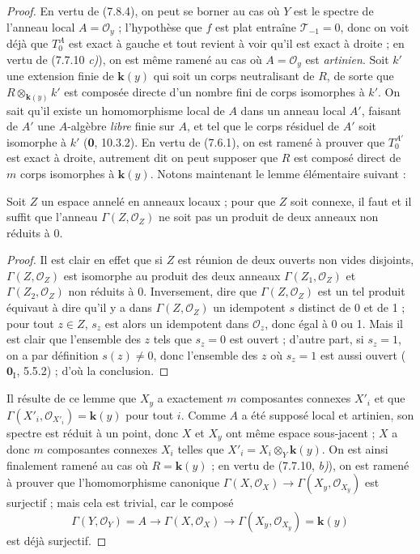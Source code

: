 \begin{proof}
En vertu de (7.8.4), on peut se borner au cas où $Y$ est le spectre de l'anneau
local $A=\mathscr O_y$ ; l'hypothèse que $f$ est plat entraîne
$\mathscr T_{-1}=0$, donc on voit déjà que $T_0^A$ est exact à gauche et tout
revient à voir qu'il est exact à droite ; en vertu de (7.7.10 \emph{c)}), on est même
ramené au cas où $A=\mathscr O_y$ est \emph{artinien}. Soit $k'$ une extension
finie de $\boldsymbol{k}(y)$ qui soit un corps neutralisant de $R$, de sorte que
$R\otimes_{\mathbf{k}(y)}k'$ est composée directe d'un nombre fini de corps
isomorphes à $k'$. On sait qu'il existe un homomorphisme local de $A$ dans un
anneau local $A'$, faisant de $A'$ une $A$-algèbre \emph{libre} finie sur $A$,
et tel que le corps résiduel de $A'$ soit isomorphe à $k'$ (\textbf{0},
10.3.2). En vertu de (7.6.1), on est ramené à prouver que $T_0^{A'}$ est exact
à droite, autrement dit on peut supposer que $R$ est composé direct de $m$
corps isomorphes à $\boldsymbol{k}(y)$. Notons maintenant le lemme élémentaire
suivant :

\begin{lemma}[7.8.6.1]
Soit $Z$ un espace annelé en anneaux locaux ; pour que $Z$ soit connexe,
il faut et il suffit que l'anneau $\Gamma(Z,\mathscr O_Z)$ ne soit pas un produit
de deux anneaux non réduits à 0.
\end{lemma}

\begin{proof}
Il est clair en effet que si $Z$ est réunion de deux ouverts non vides disjoints,
$\Gamma(Z,\mathscr O_Z)$ est isomorphe au produit des deux anneaux
$\Gamma(Z_1,\mathscr O_Z)$ et $\Gamma(Z_2,\mathscr O_Z)$ non réduits à 0.
Inversement, dire que $\Gamma(Z,\mathscr O_Z)$ est un tel produit équivaut à
dire qu'il y a dans $\Gamma(Z,\mathscr O_Z)$ un idempotent $s$ distinct de 0 et
de 1 ; pour tout $z\in Z$, $s_z$ est alors un idempotent dans $\mathscr O_z$,
donc égal à 0 ou 1. Mais il est clair que l'ensemble des $z$ tels que $s_z=0$
est ouvert ; d'autre part, si $s_z=1$, on a par définition $s(z)\ne0$, donc
l'ensemble des $z$ où $s_z=1$ est aussi ouvert ($\mathbf{0}_{\mathrm I}$, 5.5.2) ; d'où
la conclusion.
\end{proof}

Il résulte de ce lemme que $X_y$ a exactement $m$ composantes connexes $X'_i$
et que $\Gamma(X'_i,\mathscr O_{X'_i})=\boldsymbol{k}(y)$ pour tout $i$. Comme $A$ a été
supposé local et artinien, son spectre est réduit à un point, donc $X$ et $X_y$
ont même espace sous-jacent ; $X$ a donc $m$ composantes connexes $X_i$ telles
que $X'_i=X_i\otimes_Y\boldsymbol{k}(y)$. On est ainsi finalement ramené au cas où
$R=\boldsymbol{k}(y)$ ; en vertu de (7.7.10, \emph{b)}), on est ramené à prouver que
l'homomorphisme canonique
$\Gamma(X,\mathscr O_X)\to\Gamma(X_y,\mathscr O_{X_y})$
est surjectif ; mais cela est trivial, car le composé
\[
  \Gamma(Y,\mathscr O_Y)=A
  \longrightarrow
  \Gamma(X,\mathscr O_X)
  \longrightarrow
  \Gamma(X_y,\mathscr O_{X_y})=\boldsymbol{k}(y)
\]
est déjà surjectif.
\end{proof}


